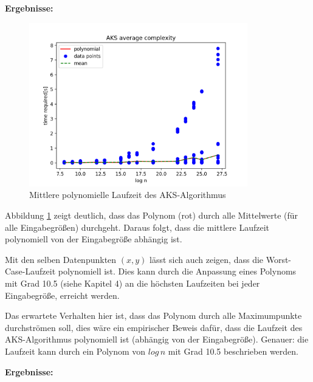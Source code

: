 \documentclass[12pt,oneside]{article}
\theoremstyle{remark}
\theoremstyle{definition}
\begin{document}
\textbf{\small{Ergebnisse:}}
\begin{figure}[h]
\includegraphics[width=9.5cm]{plots/aks_run_time.png}
\centering
\caption{Mittlere polynomielle Laufzeit des AKS-Algorithmus}
\label{runtime-aks}
\end{figure}

Abbildung \ref{runtime-aks} zeigt deutlich, dass das Polynom (rot) durch alle Mittelwerte (für alle Eingabegrößen) durchgeht. Daraus folgt, dass die mittlere Laufzeit polynomiell von der Eingabegröße abhängig ist.\newline


Mit den selben Datenpunkten $(x,y)$ lässt sich auch zeigen, dass die Worst-Case-Laufzeit polynomiell ist. Dies kann durch die Anpassung eines Polynoms mit Grad 10.5 (siehe Kapitel 4) an die höchsten Laufzeiten bei jeder Eingabegröße, erreicht werden.\newline

Das erwartete Verhalten hier ist, dass das Polynom durch alle Maximumpunkte durchströmen soll, dies wäre ein empirischer Beweis dafür, dass die Laufzeit des AKS-Algorithmus polynomiell ist (abhängig von der Eingabegröße). Genauer: die Laufzeit kann durch ein Polynom von $log \, n$ mit Grad 10.5 beschrieben werden.\par

\vfill

\textbf{Ergebnisse:}\newline
\end{document}
